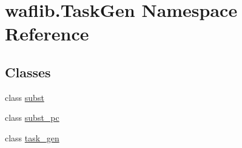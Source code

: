 \hypertarget{namespacewaflib_1_1_task_gen}{}\section{waflib.\+Task\+Gen Namespace Reference}
\label{namespacewaflib_1_1_task_gen}
\subsection*{Classes}
\begin{DoxyCompactItemize}
\item 
class \hyperlink{classwaflib_1_1_task_gen_1_1subst}{subst}
\item 
class \hyperlink{classwaflib_1_1_task_gen_1_1subst__pc}{subst\+\_\+pc}
\item 
class \hyperlink{classwaflib_1_1_task_gen_1_1task__gen}{task\+\_\+gen}
\end{DoxyCompactItemize}
